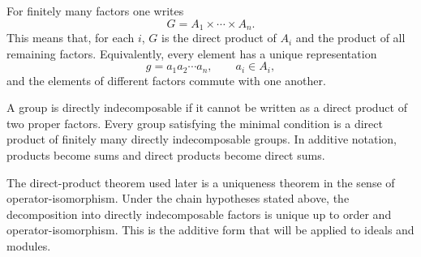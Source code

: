 \documentclass[11pt]{article}
\begin{document}
For finitely many factors one writes \[
  G=A_1\times\cdots\times A_n.
\] This means that, for each \(i\), \(G\) is the direct product of
\(A_i\) and the product of all remaining factors. Equivalently, every
element has a unique representation \[
  g=a_1a_2\cdots a_n,
  \qquad a_i\in A_i,
\] and the elements of different factors commute with one another.

A group is directly indecomposable if it cannot be written as a direct
product of two proper factors. Every group satisfying the minimal
condition is a direct product of finitely many directly indecomposable
groups. In additive notation, products become sums and direct products
become direct sums.

The direct-product theorem used later is a uniqueness theorem in the
sense of operator-isomorphism. Under the chain hypotheses stated above,
the decomposition into directly indecomposable factors is unique up to
order and operator-isomorphism. This is the additive form that will be
applied to ideals and modules.
\end{document}
